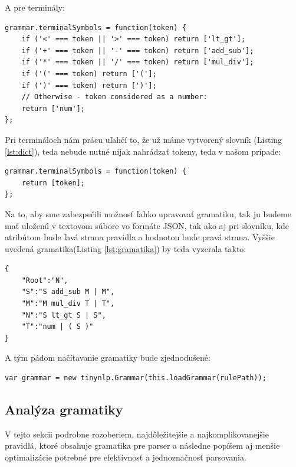 \documentclass[12pt,a4paper]{report}
\theoremstyle{definition}
\theoremstyle{remark}
\begin{document}
\bigskip A pre terminály: 

\begin{lstlisting}[caption={Vytvorenie pravidiel pre terminály}, style=htmlcssjs]
grammar.terminalSymbols = function(token) {
    if ('<' === token || '>' === token) return ['lt_gt'];
    if ('+' === token || '-' === token) return ['add_sub'];
    if ('*' === token || '/' === token) return ['mul_div'];
    if ('(' === token) return ['('];
    if (')' === token) return [')'];
    // Otherwise - token considered as a number:
    return ['num'];
};
\end{lstlisting}

\bigskip Pri termináloch nám prácu uľahčí to, že už máme vytvorený slovník (Listing \ref{lst:dict}), teda nebude nutné nijak nahrádzať tokeny, teda v našom prípade: \\
\begin{lstlisting}[style=htmlcssjs]
grammar.terminalSymbols = function(token) {
    return [token];
};
\end{lstlisting}
\bigskip
Na to, aby sme zabezpečili možnosť ľahko upravovať gramatiku, tak ju budeme mať uloženú v textovom súbore vo formáte JSON, tak ako aj pri slovníku, kde atribútom bude ľavá strana pravidla a hodnotou bude pravá strana. Vyššie uvedená gramatika(Listing \ref{lst:gramatika}) by teda vyzerala takto:

\begin{lstlisting}[caption={Ukážková gramatika V JSON-e},label={lst:gramatikaJSON},style=htmlcssjs]
{
	"Root":"N",
	"S":"S add_sub M | M",
	"M":"M mul_div T | T",
	"N":"S lt_gt S | S",
	"T":"num | ( S )"
}
\end{lstlisting}

A tým pádom načítavanie gramatiky bude zjednodušené: \\

\begin{lstlisting}[style=htmlcssjs]
var grammar = new tinynlp.Grammar(this.loadGrammar(rulePath));
\end{lstlisting}

\subsection{Analýza gramatiky}
V tejto sekcii podrobne rozoberiem, najdôležitejšie a najkomplikovanejšie pravidlá, ktoré obsahuje gramatika pre parser a následne popíšem aj menšie optimalizácie potrebné pre efektívnosť a jednoznačnosť parsovania.

\bigskip
\end{document}
